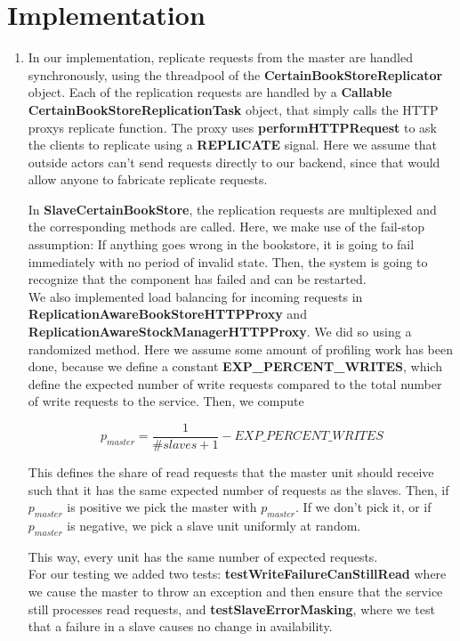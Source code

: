 \documentclass[11pt]{article}
\begin{document}
\section{Implementation}
\begin{enumerate}
  \item
    In our implementation, replicate requests from the master are handled
    synchronously, using the threadpool of the
    \textbf{CertainBookStoreReplicator} object. Each of the replication requests
    are handled by a \textbf{Callable} \textbf{CertainBookStoreReplicationTask}
    object, that simply calls the HTTP proxys replicate function. The proxy
    uses \textbf{performHTTPRequest} to ask the clients to replicate using a
    \textbf{REPLICATE} signal. Here we assume that outside actors can't send
    requests directly to our backend, since that would allow anyone to
    fabricate replicate requests.

    In \textbf{SlaveCertainBookStore}, the replication requests are multiplexed
    and the corresponding methods are called.  Here, we make use of the
    fail-stop assumption: If anything goes wrong in the bookstore, it is going
    to fail immediately with no period of invalid state. Then, the system is
    going to recognize that the component has failed and can be restarted.\\

    We also implemented load balancing for incoming requests in
    \textbf{ReplicationAwareBookStoreHTTPProxy} and
    \textbf{ReplicationAwareStockManagerHTTPProxy}. We did so using a
    randomized method. Here we assume some amount of profiling work has been
    done, because we define a constant \textbf{EXP\_PERCENT\_WRITES}, which
    define the expected number of write requests compared to the total number
    of write requests to the service.  Then, we compute 

    $$p_{master} = \frac{1}{\#slaves + 1} - EXP\_PERCENT\_WRITES$$
    
    This defines the share of read requests that the master unit should receive
    such that it has the same expected number of requests as the slaves.  Then,
    if $p_{master}$ is positive we pick the master with $p_{master}$. If we
    don't pick it, or if $p_{master}$ is negative, we pick a slave unit
    uniformly at random.

    This way, every unit has the same number of expected requests.\\

    For our testing we added two tests: \textbf{testWriteFailureCanStillRead}
    where we cause the master to throw an exception and then ensure that
    the service still processes read requests, and \textbf{testSlaveErrorMasking},
    where we test that a failure in a slave causes no change in availability.


\end{enumerate}
\end{document}
